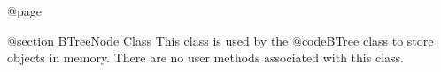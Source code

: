 @page

@section BTreeNode Class
This class is used by the @code{BTree} class to store objects in memory.
There are no user methods associated with this class.









